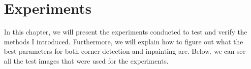 \newcommand*{\addheight}[2][.5ex]{%
  \raisebox{0pt}[\dimexpr\height+(#1)\relax]{#2}%
}

\chapter{Experiments}\label{ch:Experiments} 
In this chapter, we will present the experiments conducted to test and verify the methods I
introduced. Furthermore, we will explain how to figure out what the best parameters for both corner detection and inpainting
are. Below, we can see all the test images that were used for the experiments.
\begin{figure}[h]
    \centering
    \\\vspace{0.2cm}

\end{figure}

